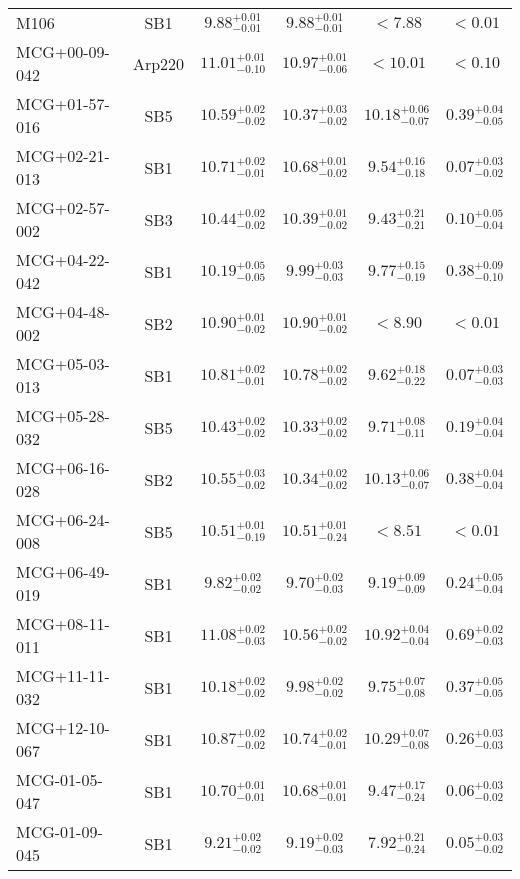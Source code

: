 \documentclass[onecolumn]{mn2e}
\begin{document}
{\begin{center}
\begin{longtable}{lccccc}
M106 & SB1 & $9.88_{-0.01}^{+0.01}$ & $9.88_{-0.01}^{+0.01}$ & $<7.88$ &$<0.01$ \\
MCG+00-09-042 & Arp220 & $11.01_{-0.10}^{+0.01}$ & $10.97_{-0.06}^{+0.01}$ & $<10.01$ &$<0.10$ \\
MCG+01-57-016 & SB5 & $10.59_{-0.02}^{+0.02}$ & $10.37_{-0.02}^{+0.03}$ & $10.18_{-0.07}^{+0.06}$ &$0.39_{-0.05}^{+0.04}$ \\
MCG+02-21-013 & SB1 & $10.71_{-0.01}^{+0.02}$ & $10.68_{-0.02}^{+0.01}$ & $9.54_{-0.18}^{+0.16}$ &$0.07_{-0.02}^{+0.03}$ \\
MCG+02-57-002 & SB3 & $10.44_{-0.02}^{+0.02}$ & $10.39_{-0.02}^{+0.01}$ & $9.43_{-0.21}^{+0.21}$ &$0.10_{-0.04}^{+0.05}$ \\
MCG+04-22-042 & SB1 & $10.19_{-0.05}^{+0.05}$ & $9.99_{-0.03}^{+0.03}$ & $9.77_{-0.19}^{+0.15}$ &$0.38_{-0.10}^{+0.09}$ \\
MCG+04-48-002 & SB2 & $10.90_{-0.02}^{+0.01}$ & $10.90_{-0.02}^{+0.01}$ & $<8.90$ &$<0.01$ \\
MCG+05-03-013 & SB1 & $10.81_{-0.01}^{+0.02}$ & $10.78_{-0.02}^{+0.02}$ & $9.62_{-0.22}^{+0.18}$ &$0.07_{-0.03}^{+0.03}$ \\
MCG+05-28-032 & SB5 & $10.43_{-0.02}^{+0.02}$ & $10.33_{-0.02}^{+0.02}$ & $9.71_{-0.11}^{+0.08}$ &$0.19_{-0.04}^{+0.04}$ \\
MCG+06-16-028 & SB2 & $10.55_{-0.02}^{+0.03}$ & $10.34_{-0.02}^{+0.02}$ & $10.13_{-0.07}^{+0.06}$ &$0.38_{-0.04}^{+0.04}$ \\
MCG+06-24-008 & SB5 & $10.51_{-0.19}^{+0.01}$ & $10.51_{-0.24}^{+0.01}$ & $<8.51$ &$<0.01$ \\
MCG+06-49-019 & SB1 & $9.82_{-0.02}^{+0.02}$ & $9.70_{-0.03}^{+0.02}$ & $9.19_{-0.09}^{+0.09}$ &$0.24_{-0.04}^{+0.05}$ \\
MCG+08-11-011 & SB1 & $11.08_{-0.03}^{+0.02}$ & $10.56_{-0.02}^{+0.02}$ & $10.92_{-0.04}^{+0.04}$ &$0.69_{-0.03}^{+0.02}$ \\
MCG+11-11-032 & SB1 & $10.18_{-0.02}^{+0.02}$ & $9.98_{-0.02}^{+0.02}$ & $9.75_{-0.08}^{+0.07}$ &$0.37_{-0.05}^{+0.05}$ \\
MCG+12-10-067 & SB1 & $10.87_{-0.02}^{+0.02}$ & $10.74_{-0.01}^{+0.02}$ & $10.29_{-0.08}^{+0.07}$ &$0.26_{-0.03}^{+0.03}$ \\
MCG-01-05-047 & SB1 & $10.70_{-0.01}^{+0.01}$ & $10.68_{-0.01}^{+0.01}$ & $9.47_{-0.24}^{+0.17}$ &$0.06_{-0.02}^{+0.03}$ \\
MCG-01-09-045 & SB1 & $9.21_{-0.02}^{+0.02}$ & $9.19_{-0.03}^{+0.02}$ & $7.92_{-0.24}^{+0.21}$ &$0.05_{-0.02}^{+0.03}$ \\

\end{longtable}
\end{center}}
\end{document}
